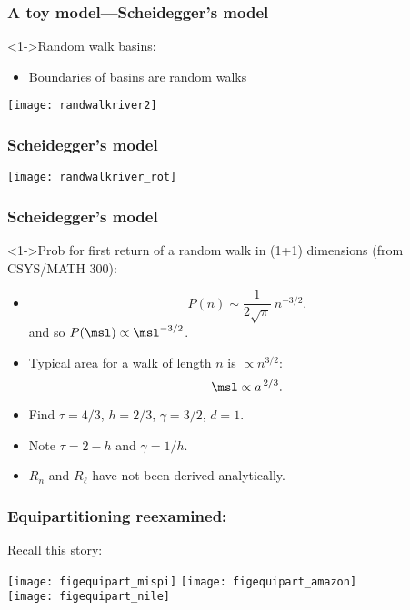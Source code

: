 \begin{frame}[label=]
  \frametitle{A toy model---Scheidegger's model}

  \begin{block}<1->{Random walk basins:}
    \begin{itemize}
    \item<1->Boundaries of basins are random walks
    \end{itemize}
    \texttt{[image: randwalkriver2]}
  \end{block}
\end{frame}

\begin{frame}[label=]
  \frametitle{Scheidegger's model}

  \begin{center}
    \texttt{[image: randwalkriver\_rot]}
  \end{center}

\end{frame}

\begin{frame}[label=]
  \frametitle{Scheidegger's model}

  \begin{block}<1->{Prob for first return of a random walk in (1+1) dimensions (from CSYS/MATH 300):}
  \begin{itemize}
    \item<2->
      $$P(n) \sim \frac{1}{2\sqrt{\pi}}\  n^{-3/2}.$$
      and so $P(\msl) \propto \msl^{-3/2}$.
    \item<3->
      Typical area for a walk of length $n$ is $\propto n^{3/2}$:
      $$ \msl \propto a^{\, 2/3}.$$
    \item<4->
      Find $\tau=4/3$, $h=2/3$, $\gamma = 3/2$, $d=1$.
    \item<5->
      Note $\tau = 2 - h$ and $\gamma = 1/h$.
    \item<6->
      $R_n$ and $R_\ell$ have not been derived analytically.
    \end{itemize}
  \end{block}
\end{frame}

\begin{frame}[label=]
  \frametitle{Equipartitioning reexamined:}

  \begin{block}{Recall this story:}
    \begin{center}
      \texttt{[image: figequipart\_mispi]}
      \texttt{[image: figequipart\_amazon]}\\
      \texttt{[image: figequipart\_nile]}
    \end{center}
  \end{block}

\end{frame}

